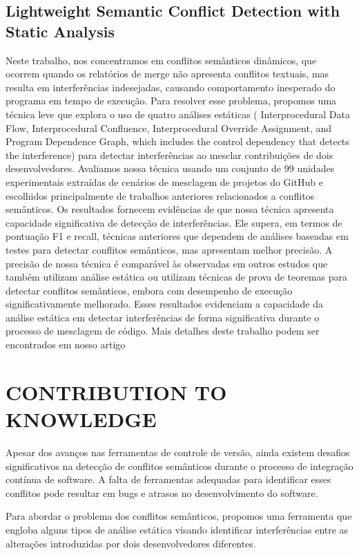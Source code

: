 \documentclass[sigconf,review]{acmart}
\begin{document}
\subsection{Lightweight Semantic Conflict Detection with Static Analysis}
Neste trabalho, nos concentramos em conflitos semânticos dinâmicos, que ocorrem quando os relatórios de merge não apresenta conflitos textuais, mas resulta em interferências indesejadas, causando comportamento inesperado do programa em tempo de execução.
Para resolver esse problema, propomos uma técnica leve que explora o uso de quatro análises estáticas ( Interprocedural Data Flow, Interprocedural
Confluence, Interprocedural Override Assignment, and Program Dependence Graph, which includes the control
dependency that detects the interference) para detectar interferências ao mesclar contribuições de dois desenvolvedores.
Avaliamos nossa técnica usando um conjunto de 99 unidades experimentais extraídas de cenários de mesclagem de projetos do GitHub e escolhidos principalmente de trabalhos anteriores relacionados a conflitos semânticos. 
Os resultados fornecem evidências de que nossa técnica apresenta capacidade significativa de detecção de interferências. Ele supera, em termos de pontuação F1 e recall, técnicas anteriores que dependem de análises baseadas em testes para detectar conflitos semânticos, mas apresentam melhor precisão.
A precisão de nossa técnica é comparável às observadas em outros estudos que também utilizam análise estática ou utilizam técnicas de prova de teoremas para detectar conflitos semânticos, embora com desempenho de execução significativamente melhorado. Esses resultados evidenciam a capacidade da análise estática em detectar interferências de forma significativa durante o processo de mesclagem de código. Mais detalhes deste trabalho podem ser encontrados em nosso artigo \cite{galileu}

\section{CONTRIBUTION TO KNOWLEDGE}

Apesar dos avanços nas ferramentas de controle de versão, ainda existem desafios significativos na detecção de conflitos semânticos durante o processo de integração contínua de software. A falta de ferramentas adequadas para identificar esses conflitos pode resultar em bugs e atrasos no desenvolvimento do software.

Para abordar o problema dos conflitos semânticos, propomos uma ferramenta que engloba alguns tipos de análise estática visando identificar interferências entre as alterações introduzidas por dois desenvolvedores diferentes. 
\end{document}
